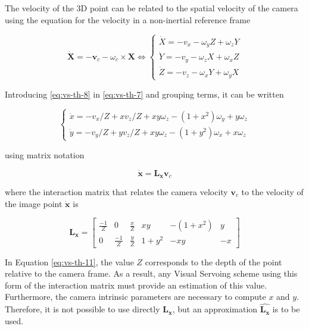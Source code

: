 The velocity of the 3D point can be related to the spatial velocity of the camera using the equation for the velocity in a non-inertial reference frame

\begin{equation}
\dot{\bm{X}} = - \bm{v}_c - \omega_c \times \bm{X} \Leftrightarrow
\begin{cases}
\dot{X} = - v_x - \omega_y Z + \omega_z Y \\
\dot{Y} = - v_y - \omega_z X + \omega_x Z \\
\dot{Z} = - v_z - \omega_x Y + \omega_y X 
\end{cases}
\label{eq:vs-th-8}
\end{equation}

Introducing \ref{eq:vs-th-8} in \ref{eq:vs-th-7} and grouping terms, it can be written

\begin{equation}
\begin{cases}
\dot{x} = - v_x / Z + x v_z / Z + xy \omega_z - (1 + x^2) \omega_y + y \omega_z \\
\dot{y} = - v_y / Z + y v_z / Z + xy \omega_z - (1 + y^2) \omega_x + x \omega_z 
\end{cases}
\label{eq:vs-th-9}
\end{equation}

using matrix notation

\begin{equation}
\dot{\bm{x}} = \bm{L_x} \bm{v}_c
\label{eq:vs-th-10}
\end{equation}

where the interaction matrix that relates the camera velocity $\bm{v}_c$ to the velocity of the image point $\dot{\bm{x}}$ is

\begin{equation}
\bm{L_x} = 
\begin{bmatrix}
\frac{-1}{Z} & 0  & \frac{x}{Z}  & xy  &  -(1+x^2) & y \\ 
0 & \frac{-1}{Z} &  \frac{y}{Z} & 1+y^2 &  -xy & -x
\end{bmatrix}
\label{eq:vs-th-11}
\end{equation}

In Equation \ref{eq:vs-th-11}, the value $Z$ corresponds to the depth of the point relative to the camera frame. As a result, any Visual Servoing scheme using this form of the interaction matrix must provide an estimation of this value. Furthermore, the camera intrinsic parameters are necessary to compute $x$ and $y$. Therefore, it is not possible to use directly $\bm{L_x}$, but an approximation $\widehat{\bm{L_x}}$ is to be used.

